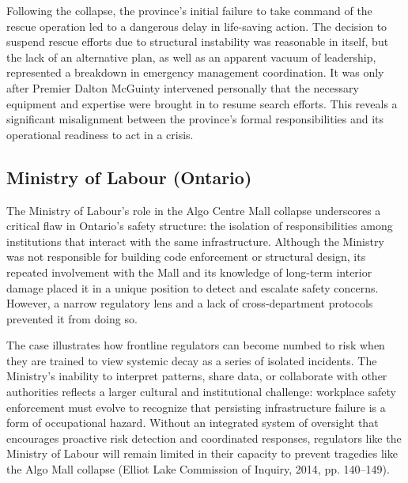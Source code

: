 \documentclass[12pt]{article}
\begin{document}
Following the collapse, the province’s initial failure to take command of the rescue operation led to a dangerous delay in life-saving action. The decision to suspend rescue efforts due to structural instability was reasonable in itself, but the lack of an alternative plan, as well as an apparent vacuum of leadership, represented a breakdown in emergency management coordination. It was only after Premier Dalton McGuinty intervened personally that the necessary equipment and expertise were brought in to resume search efforts. This reveals a significant misalignment between the province’s formal responsibilities and its operational readiness to act in a crisis.

\subsection{Ministry of Labour (Ontario)}
The Ministry of Labour’s role in the Algo Centre Mall collapse underscores a critical flaw in Ontario’s safety structure: the isolation of responsibilities among institutions that interact with the same infrastructure. Although the Ministry was not responsible for building code enforcement or structural design, its repeated involvement with the Mall and its knowledge of long-term interior damage placed it in a unique position to detect and escalate safety concerns. However, a narrow regulatory lens and a lack of cross-department protocols prevented it from doing so.

The case illustrates how frontline regulators can become numbed to risk when they are trained to view systemic decay as a series of isolated incidents. The Ministry’s inability to interpret patterns, share data, or collaborate with other authorities reflects a larger cultural and institutional challenge: workplace safety enforcement must evolve to recognize that persisting infrastructure failure is a form of occupational hazard. Without an integrated system of oversight that encourages proactive risk detection and coordinated responses, regulators like the Ministry of Labour will remain limited in their capacity to prevent tragedies like the Algo Mall collapse (Elliot Lake Commission of Inquiry, 2014, pp. 140–149).
\end{document}
